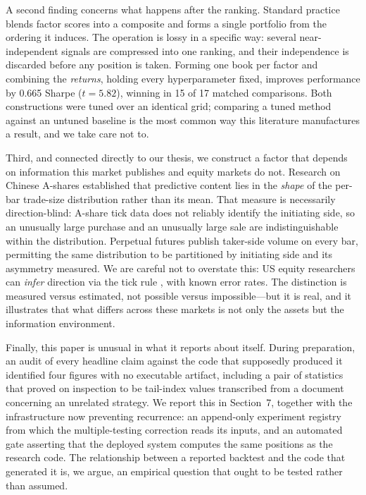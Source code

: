 \documentclass[11pt,letterpaper]{article}
\begin{document}
A second finding concerns what happens after the ranking. Standard practice
blends factor scores into a composite and forms a single portfolio from the
ordering it induces. The operation is lossy in a specific way: several
near-independent signals are compressed into one ranking, and their independence
is discarded before any position is taken. Forming one book per factor and
combining the \emph{returns}, holding every hyperparameter fixed, improves
performance by 0.665 Sharpe ($t = 5.82$), winning in 15 of 17 matched
comparisons. Both constructions were tuned over an identical grid; comparing a
tuned method against an untuned baseline is the most common way this literature
manufactures a result, and we take care not to.

Third, and connected directly to our thesis, we construct a factor that depends
on information this market publishes and equity markets do not. Research on
Chinese A-shares established that predictive content lies in the \emph{shape} of
the per-bar trade-size distribution rather than its mean. That measure is
necessarily direction-blind: A-share tick data does not reliably identify the
initiating side, so an unusually large purchase and an unusually large sale are
indistinguishable within the distribution. Perpetual futures publish taker-side
volume on every bar, permitting the same distribution to be partitioned by
initiating side and its asymmetry measured. We are careful not to overstate
this: US equity researchers can \emph{infer} direction via the tick rule
\citep{leeready1991}, with known error rates. The distinction is measured versus
estimated, not possible versus impossible---but it is real, and it illustrates
that what differs across these markets is not only the assets but the
information environment.

Finally, this paper is unusual in what it reports about itself. During
preparation, an audit of every headline claim against the code that supposedly
produced it identified four figures with no executable artifact, including a
pair of statistics that proved on inspection to be tail-index values transcribed
from a document concerning an unrelated strategy. We report this in Section~7,
together with the infrastructure now preventing recurrence: an append-only
experiment registry from which the multiple-testing correction reads its inputs,
and an automated gate asserting that the deployed system computes the same
positions as the research code. The relationship between a reported backtest and
the code that generated it is, we argue, an empirical question that ought to be
tested rather than assumed.
\end{document}
